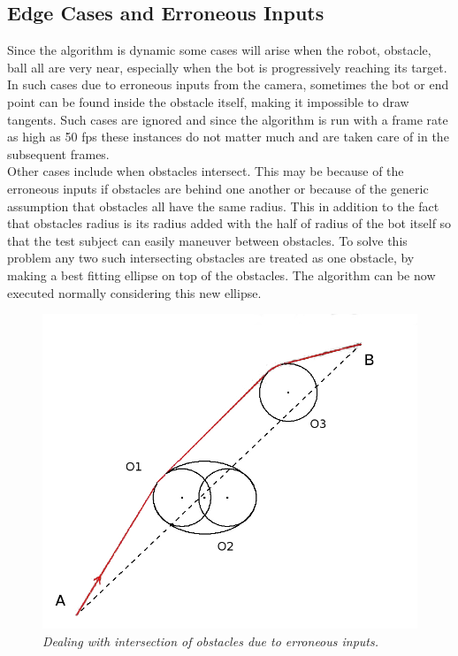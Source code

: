 \documentclass[letterpaper, 10 pt, conference]{ieeeconf}  %
\begin{document}
\subsection{Edge Cases and Erroneous Inputs}
Since the algorithm is dynamic some cases will arise when the robot, obstacle, ball all are very near, especially when the bot is progressively reaching its target. In such cases due to erroneous inputs from the camera, sometimes the bot or end point can be found inside the obstacle itself, making it impossible to draw tangents. Such cases are ignored and since the algorithm is run with a frame rate as high as 50 fps these instances do not matter much and are taken care of in the subsequent frames.
\\ 
Other cases include when obstacles intersect. This may be because of the erroneous inputs if obstacles are behind one another or because of the generic assumption that obstacles all have the same radius. This in addition to the fact that obstacles radius is its radius added with the half of radius of the bot itself so that the test subject can easily maneuver between obstacles. To solve this problem any two such intersecting obstacles are treated as one obstacle, by making a best fitting ellipse on top of the obstacles. The algorithm can be now executed normally considering this new ellipse.

\begin{figure}[h]  
\begin{center}  
\includegraphics[scale=0.3]{intersection1.JPG}  
\caption{\small \sl Dealing with intersection of obstacles due to erroneous inputs.\label{fig: intersection}}  
\end{center}  
\end{figure}
\end{document}
